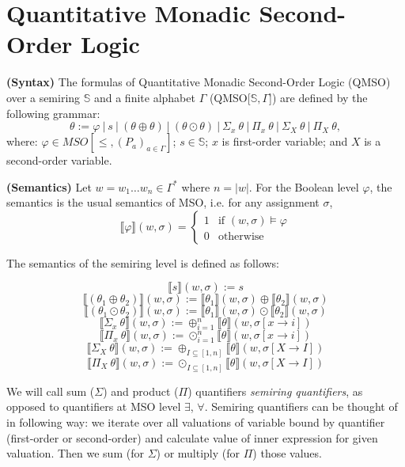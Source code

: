 \documentclass[en]{pracamgr}
\theoremstyle{definition}
\begin{document}
\section{Quantitative Monadic Second-Order Logic}

\textbf{(Syntax)} The formulas of Quantitative Monadic Second-Order Logic (QMSO) over a semiring $\mathbb{S}$ and a finite alphabet $\Gamma$ (QMSO[$\mathbb{S}, \Gamma$]) are defined by the following grammar:
$$ \theta := \varphi \ | \ s \ | \ (\theta \oplus \theta) \ | \ (\theta \odot \theta) \ | \ \Sigma_x \ \theta \ | \ \Pi_x \ \theta \ | \ \Sigma_X \ \theta \ | \ \Pi_X \ \theta,$$
where: $\varphi \in MSO[\leq, (P_a)_{a \in \Gamma}]$; $s \in \mathbb{S}$; $x$ is first-order variable; and $X$ is a second-order variable.

\textbf{(Semantics)} Let $w 
= w_1 \dots w_n \in \Gamma^*$ where $n = |w|$. For the Boolean level $\varphi$, the semantics is the usual semantics of MSO, i.e. for any assignment $\sigma$,
\begin{equation*}
    \llbracket\varphi\rrbracket(w, \sigma) =
      \begin{cases}
        1 & \text{if $(w, \sigma) \models \varphi$}\\
        0 & \text{otherwise}
      \end{cases}       
\end{equation*}

The semantics of the semiring level is defined as follows:

$$\llbracket s\rrbracket(w, \sigma) := s$$
$$\llbracket(\theta_1 \oplus \theta_2)\rrbracket(w, \sigma) := \llbracket\theta_1\rrbracket(w, \sigma) \oplus \llbracket\theta_2\rrbracket(w, \sigma)$$
$$\llbracket(\theta_1 \odot \theta_2)\rrbracket(w, \sigma) := \llbracket\theta_1\rrbracket(w, \sigma) \odot \llbracket\theta_2\rrbracket(w, \sigma)$$
$$\llbracket \Sigma_x \ \theta \rrbracket(w, \sigma) := \oplus^n_{i=1}\llbracket \theta \rrbracket (w, \sigma[x \rightarrow i])$$
$$\llbracket \Pi_x \ \theta \rrbracket(w, \sigma) := \odot^n_{i=1}\llbracket \theta \rrbracket (w, \sigma[x \rightarrow i])$$
$$\llbracket \Sigma_X \ \theta \rrbracket(w, \sigma) := \oplus_{I \subseteq [1,n]}\llbracket \theta \rrbracket (w, \sigma[X \rightarrow I])$$
$$\llbracket \Pi_X \ \theta \rrbracket(w, \sigma) := \odot_{I \subseteq [1,n]}\llbracket \theta \rrbracket (w, \sigma[X \rightarrow I])$$

We will call sum ($\Sigma$) and product ($\Pi$) quantifiers \emph{semiring quantifiers}, as opposed to quantifiers at MSO level $\exists$, $\forall$. Semiring quantifiers can be thought of in following way: we iterate over all valuations of variable bound by quantifier (first-order or second-order) and calculate value of inner expression for given valuation. Then we sum (for $\Sigma$) or multiply (for $\Pi$) those values.
\end{document}
